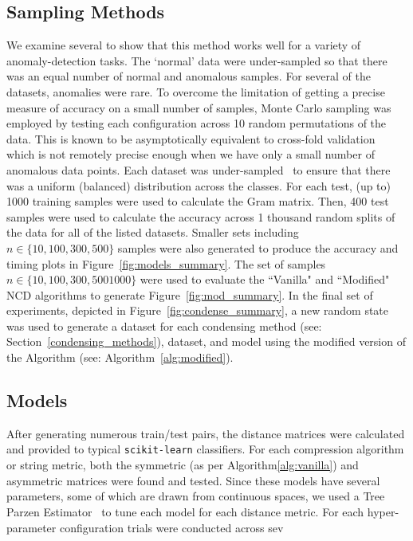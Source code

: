 \documentclass[conference]{IEEEtran}
\begin{document}
\subsection{Sampling Methods}
We examine several to show that this method works well for a variety of anomaly-detection tasks. The `normal' data were under-sampled so that there was an equal number of normal and anomalous samples. For several of the datasets, anomalies were rare. 
To overcome the limitation of getting a precise measure of accuracy on a small number of samples, Monte Carlo sampling was employed by testing each configuration across 10 random permutations of the data. 
This is known to be asymptotically equivalent to cross-fold validation~\cite{shan2022monte} which is not remotely precise enough when we have only a small number of anomalous data points. 
Each dataset was under-sampled~\cite{} to ensure that there was a uniform (balanced) distribution across the classes. 
For each test, (up to) 1000 training samples were used to calculate the Gram matrix.
Then, 400 test samples were used to calculate the accuracy across 1 thousand random splits of the data for all of the listed datasets. 
Smaller sets including $n \in \{ 10, 100, 300, 500 \}$ samples were also generated to produce the accuracy and timing plots in Figure~\ref{fig:models_summary}. 
The set of samples $n \in \{ 10, 100, 300, 500 1000\}$ were used to evaluate the ``Vanilla" and ``Modified" NCD algorithms to generate Figure~\ref{fig:mod_summary}.
In the final set of experiments, depicted in Figure~\ref{fig:condense_summary}, a new random state was used to generate a dataset for each condensing method (see: Section~\ref{condensing_methods}), dataset, and model using the modified version of the Algorithm (see: Algorithm~\ref{alg:modified}).

\subsection{Models}
After generating numerous train/test pairs, the distance matrices were calculated and provided to typical \texttt{scikit-learn} classifiers. For each compression algorithm or string metric, both the symmetric (as per  Algorithm\ref{alg:vanilla}) and asymmetric matrices were found and tested. Since these models have several parameters, some of which are drawn from continuous spaces, we used a Tree Parzen Estimator~\cite{tpe} to tune each model for each distance metric. For each hyper-parameter configuration trials were conducted across sev
\end{document}
